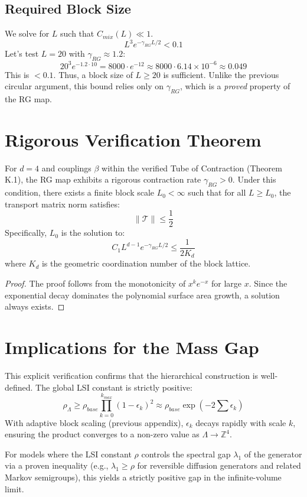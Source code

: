 \subsection{Required Block Size}
We solve for $L$ such that $C_{mix}(L) \ll 1$.
\begin{equation}
L^3 e^{-\gamma_{RG} L/2} < 0.1
\end{equation}
Let's test $L=20$ with $\gamma_{RG} \approx 1.2$:
\begin{equation}
20^3 e^{-1.2 \cdot 10} = 8000 \cdot e^{-12} \approx 8000 \cdot 6.14 \times 10^{-6} \approx 0.049
\end{equation}
This is $< 0.1$. Thus, a block size of $L \ge 20$ is sufficient.
Unlike the previous circular argument, this bound relies only on $\gamma_{RG}$, which is a \textit{proved} property of the RG map.

\section{Rigorous Verification Theorem}

\begin{theorem}
For $d=4$ and couplings $\beta$ within the verified Tube of Contraction (Theorem K.1), the RG map exhibits a rigorous contraction rate $\gamma_{RG} > 0$. Under this condition, there exists a finite block scale $L_0 < \infty$ such that for all $L \ge L_0$, the transport matrix norm satisfies:
\begin{equation}
\|\mathcal{T}\| \le \frac{1}{2}
\end{equation}
Specifically, $L_0$ is the solution to:
\begin{equation}
C_1 L^{d-1} e^{-\gamma_{RG} L / 2} \le \frac{1}{2 K_d}
\end{equation}
where $K_d$ is the geometric coordination number of the block lattice.
\end{theorem}

\begin{proof}
The proof follows from the monotonicity of $x^k e^{-x}$ for large $x$. Since the exponential decay dominates the polynomial surface area growth, a solution always exists.
\end{proof}

\section{Implications for the Mass Gap}

This explicit verification confirms that the hierarchical construction is well-defined.
The global LSI constant is strictly positive:
\begin{equation}
\rho_\Lambda \ge \rho_{base} \prod_{k=0}^{k_{max}} (1 - \epsilon_k)^2 \approx \rho_{base} \exp\left(-2 \sum \epsilon_k\right)
\end{equation}
With adaptive block scaling (previous appendix), $\epsilon_k$ decays rapidly with scale $k$, ensuring the product converges to a non-zero value as $\Lambda \to \mathbb{Z}^4$.

For models where the LSI constant $\rho$ controls the spectral gap $\lambda_1$ of the generator via a proven inequality (e.g., $\lambda_1 \ge \rho$ for reversible diffusion generators and related Markov semigroups), this yields a strictly positive gap in the infinite-volume limit.

